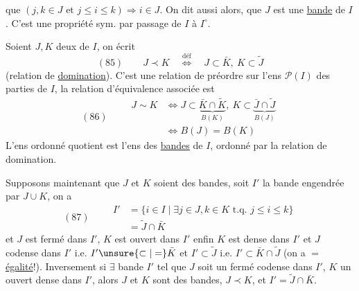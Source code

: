
que  $(j,k\in J\text{ et }j\leq i\leq k)\Longrightarrow i\in J$. On dit aussi alors, que $J$ est une \uline{bande} de $I$. C'est  une propriété sym. par passage de $I$ à $I^\circ$.

Soient $J,K$ deux   de $I$, on écrit
\[
(85)\qquad J\prec K\quad\overset{\mathrm{déf}}{\Longleftrightarrow}\quad J\subset\bar K,\ K\subset\widetilde J
\]
(relation de \uline{domination}). C'est une relation de préordre sur l'ens $\mathcal P(I)$ des parties de $I$, la relation d'équivalence associée est
\[
(86)\qquad\begin{aligned}
J\sim K&\Longleftrightarrow J\subset\underbrace{\bar K\cap\widetilde K}_{B(K)},\ K\subset\underbrace{\bar J\cap\widetilde J}_{B(J)}\\
&\Longleftrightarrow B(J)=B(K)
\end{aligned}
\]
L'ens ordonné quotient est l'ens des \uline{bandes} de $I$, ordonné par la relation de  domination.

Supposons maintenant que $J$ et $K$ soient des bandes,  soit $I'$ la bande engendrée par $J\cup K$, on a
\[
(87)\qquad\begin{aligned}
I'&=\{i\in I\mid\exists j\in J,k\in K\text{ t.q. }j\leq i\leq k\}\\
&=\widetilde J\cap\bar K
\end{aligned}
\]
et $J$ est fermé dans $I'$, $K$ est ouvert dans $I'$ enfin  $K$ est dense dans $I'$ et $J$ codense dans $I'$ i.e. $I'\unsure{\subset|=}\bar K$ et $I'\subset\widetilde J$  i.e. $I'\subset\bar K\cap\widetilde J$ (on a $=$ \uline{égalité}!). Inversement si $\exists$ bande $I'$ tel que $J$ soit un fermé codense dans $I'$, $K$ un ouvert dense dans $I'$, alors $J$ et $K$ sont des bandes, $J\prec K$, et  $I'=\widetilde J\cap\bar K$.
